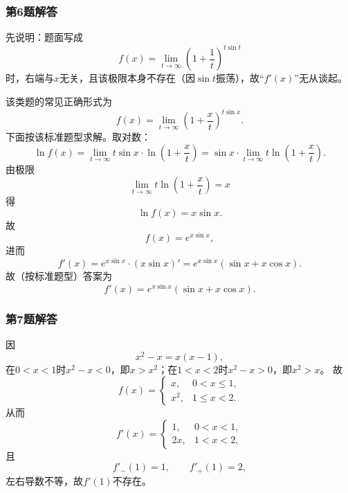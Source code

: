 \documentclass[./book.tex]{subfiles}
\begin{document}
    \subsubsection*{第6题解答}
    \begin{analysisbox}
        先说明：题面写成
        \[
            f(x)=\lim_{t\to\infty}\left(1+\frac1t\right)^{t\sin t}
        \]
        时，右端与$x$无关，且该极限本身不存在（因$\sin t$振荡），故“$f'(x)$”无从谈起。

        该类题的常见正确形式为
        \[
            f(x)=\lim_{t\to\infty}\left(1+\frac{x}{t}\right)^{t\sin x}.
        \]
        下面按该标准题型求解。取对数：
        \[
            \ln f(x)=\lim_{t\to\infty}t\sin x\cdot \ln\left(1+\frac xt\right)
            =\sin x\cdot \lim_{t\to\infty}t\ln\left(1+\frac xt\right).
        \]
        由极限
        \[
            \lim_{t\to\infty}t\ln\left(1+\frac xt\right)=x
        \]
        得
        \[
            \ln f(x)=x\sin x.
        \]
        故
        \[
            f(x)=e^{x\sin x},
        \]
        进而
        \[
            f'(x)=e^{x\sin x}\cdot (x\sin x)'=e^{x\sin x}(\sin x+x\cos x).
        \]
        故（按标准题型）答案为
        \[
            \boxed{f'(x)=e^{x\sin x}(\sin x+x\cos x)}.
        \]
    \end{analysisbox}

    \subsubsection*{第7题解答}
    \begin{analysisbox}
        因
        \[
            x^2-x=x(x-1),
        \]
        在$0<x<1$时$x^2-x<0$，即$x>x^2$；在$1<x<2$时$x^2-x>0$，即$x^2>x$。
        故
        \[
            f(x)=
            \begin{cases}
                x, & 0<x\le 1,\\[0.3em]
                x^2, & 1\le x<2.
            \end{cases}
        \]
        从而
        \[
            f'(x)=
            \begin{cases}
                1, & 0<x<1,\\
                2x, & 1<x<2,
            \end{cases}
        \]
        且
        \[
            f'_-(1)=1,\qquad f'_+(1)=2,
        \]
        左右导数不等，故$f'(1)$不存在。
    \end{analysisbox}
\end{document}
